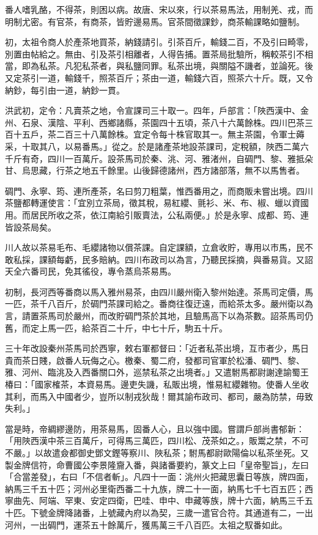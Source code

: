 番人嗜乳酪，不得茶，則困以病。故唐、宋以來，行以茶易馬法，用制羌、戎，而明制尤密。有官茶，有商茶，皆貯邊易馬。官茶間徵課鈔，商茶輸課略如鹽制。

初，太祖令商人於產茶地買茶，納錢請引。引茶百斤，輸錢二百，不及引曰畸零，別置由帖給之。無由、引及茶引相離者，人得告捕。置茶局批驗所，稱較茶引不相當，即為私茶。凡犯私茶者，與私鹽同罪。私茶出境，與關隘不譏者，並論死。後又定茶引一道，輸錢千，照茶百斤；茶由一道，輸錢六百，照茶六十斤。既，又令納鈔，每引由一道，納鈔一貫。

洪武初，定令：凡賣茶之地，令宣課司三十取一。四年，戶部言：「陜西漢中、金州、石泉、漢陰、平利、西鄉諸縣，茶園四十五頃，茶八十六萬餘株。四川巴茶三百十五戶，茶二百三十八萬餘株。宜定令每十株官取其一。無主茶園，令軍士薅采，十取其八，以易番馬。」從之。於是諸產茶地設茶課司，定稅額，陜西二萬六千斤有奇，四川一百萬斤。設茶馬司於秦、洮、河、雅渚州，自碉門、黎、雅抵朵甘、烏思藏，行茶之地五千餘里。山後歸德諸州，西方諸部落，無不以馬售者。

碉門、永寧、筠、連所產茶，名曰剪刀粗葉，惟西番用之，而商販未嘗出境。四川茶鹽都轉運使言：「宜別立茶局，徵其稅，易紅纓、氈衫、米、布、椒、蠟以資國用。而居民所收之茶，依江南給引販賣法，公私兩便。」於是永寧、成都、筠、連皆設茶局矣。

川人故以茶易毛布、毛纓諸物以償茶課。自定課額，立倉收貯，專用以市馬，民不敢私採，課額每虧，民多賠納。四川布政司以為言，乃聽民採摘，與番易貨。又詔天全六番司民，免其徭役，專令蒸烏茶易馬。

初制，長河西等番商以馬入雅州易茶，由四川嚴州衛入黎州始達。茶馬司定價，馬一匹，茶千八百斤，於碉門茶課司給之。番商往復迂遠，而給茶太多。嚴州衛以為言，請置茶馬司於嚴州，而改貯碉門茶於其地，且驗馬高下以為茶數。詔茶馬司仍舊，而定上馬一匹，給茶百二十斤，中七十斤，駒五十斤。

三十年改設秦州茶馬司於西寧，敕右軍都督曰：「近者私茶出境，互市者少，馬日貴而茶日賤，啟番人玩侮之心。檄秦、蜀二府，發都司官軍於松潘、碉門、黎、雅、河州、臨洮及入西番關口外，巡禁私茶之出境者。」又遣駙馬都尉謝達諭蜀王椿曰：「國家榷茶，本資易馬。邊吏失譏，私販出境，惟易紅纓雜物。使番人坐收其利，而馬入中國者少，豈所以制戎狄哉！爾其諭布政司、都司，嚴為防禁，毋致失利。」

當是時，帝綢繆邊防，用茶易馬，固番人心，且以強中國。嘗謂戶部尚書郁新：「用陜西漢中茶三百萬斤，可得馬三萬匹，四川松、茂茶如之。，販鬻之禁，不可不嚴。」以故遣僉都御史鄧文鏗等察川、陜私茶；駙馬都尉歐陽倫以私茶坐死。又製金牌信符，命曹國公李景隆齎入番，與諸番要約，篆文上曰「皇帝聖旨」，左曰「合當差發」，右曰「不信者斬」。凡四十一面：洮州火把藏思囊日等族，牌四面，納馬三千五十匹；河州必里衛西番二十九族，牌二十一面，納馬七千七百五匹；西寧曲先、阿端、罕東、安定四衛，巴哇、申中、申藏等族，牌十六面，納馬三千五十匹。下號金牌降諸番，上號藏內府以為契，三歲一遣官合符。其通道有二，一出河州，一出碉門，運茶五十餘萬斤，獲馬萬三千八百匹。太祖之馭番如此。

